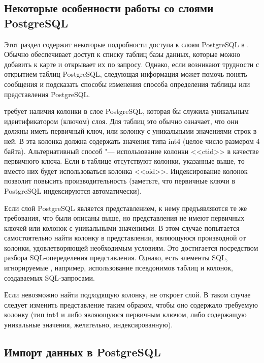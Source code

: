 \subsection{Некоторые особенности работы со слоями PostgreSQL}
\label{sec:postgis_details}

Этот раздел содержит некоторые подробности доступа к слоям PostgreSQL в \qg.
Обычно \qg обеспечивает доступ к списку таблиц базы данных, которые можно
добавить к карте и открывает их по запросу. Однако, если возникают трудности
с открытием таблиц PostgreSQL, следующая информация может помочь
понять сообщения \qg и подсказать способы изменения способа определения
таблицы или представления PostgreSQL.

\qg требует наличия колонки в слое PostgreSQL, которая бы служила уникальным
идентификатором (ключом) слоя. Для таблиц это обычно означает, что они должны
иметь первичный ключ, или колонку с уникальными значениями строк в ней.
В \qg эта колонка должна содержать значения типа int4 (целое число размером
4 байта). Альтернативный способ "--- использование колонки <<ctid>> в качестве
первичного ключа. Если в таблице отсутствуют колонки, указанные выше, то
вместо них будет использоваться колонка <<oid>>. Индексирование колонок позволит
повысить производительность (заметьте, что первичные ключи в PostgreSQL
индексируются автоматически).

Если слой PostgreSQL является представлением, к нему предъявляются те же
требования, что были описаны выше, но представления не имеют первичных
ключей или колонок с уникальными значениями. В этом случае \qg попытается
самостоятельно найти колонку в представлении, являющуюся производной от
колонки, удовлетворяющей необходимым условиям. Это достигается посредством
разбора SQL-опеределения представления. Однако, есть элементы SQL,
игнорируемые \qg, например, использование псевдонимов таблиц и колонок,
создаваемых SQL-запросами.

Если невозможно найти подходящую колонку, \qg не откроет слой. В таком
случае следует изменить представление таким образом, чтобы оно содержало
требуемую колонку (тип int4 и либо являющуюся первичным ключом, либо
содержащую уникальные значения, желательно, индексированную).


\subsection{Импорт данных в PostgreSQL}\label{sec:loading_postgis_data}

